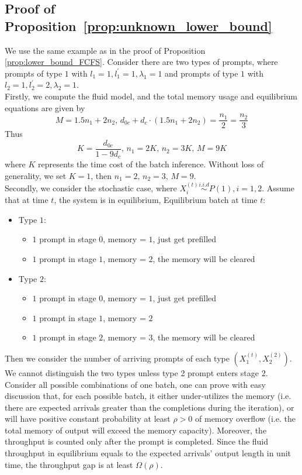 \subsection{Proof of Proposition~\ref{prop:unknown_lower_bound}}\label{sec:proof_unknown_lower_bound}
We use the same example as in the proof of Proposition \ref{prop:lower_bound_FCFS}. Consider there are two types of prompts, where prompts of type $1$ with $l_1=1, l_1^\prime=1, \lambda_1=1$ and prompts of type $1$ with $l_2=1, l_2^\prime=2, \lambda_2=1$. \\
Firstly, we compute the fluid model, and the total memory usage and equilibrium equations are given by
$$M = 1.5n_1+2n_2,\, d_{0c}+d_c\cdot (1.5n_1+2n_2) = \frac{n_1}{2}=\frac{n_2}{3}$$
Thus
$$K = \frac{d_{0c}}{1-9d_c},\, n_1 = 2K,\, n_2=3K,\, M=9K$$
where $K$ represents the time cost of the batch inference. Without loss of generality, we set $K=1$, then $n_1=2, \,n_2=3,\,M=9 $. \\
Secondly, we consider the stochastic case, where $X_i^{(t)}\overset{i.i.d}{\sim} P(1), i=1,2$. Assume that at time $t$, the system is in equilibrium, Equilibrium batch at time $t$:
\begin{itemize}
    \item Type $1$:
    \begin{itemize}
        \itemsep0em
        \item $1$ prompt in stage $0$, memory = $1$, just get prefilled
        \item $1$ prompt in stage $1$, memory = $2$, the memory will be cleared
    \end{itemize}
    \item Type $2$:
    \begin{itemize}
        \itemsep0em
        \item $1$ prompt in stage $0$, memory = $1$, just get prefilled
        \item $1$ prompt in stage $1$, memory = $2$
        \item $1$ prompt in stage $2$, memory = $3$, the memory will be cleared
    \end{itemize}
\end{itemize}
Then we consider the number of arriving prompts of each type $(X_1^{(t)}, X_2^{(2)})$. We cannot distinguish the two types unless type 2 prompt enters stage $2$. Consider all possible combinations of one batch, one can prove with easy discussion that, for each possible batch, it either under-utilizes the memory (i.e. there are expected arrivals greater than the completions during the iteration), or will have positive constant probability at least $\rho>0$ of memory overflow (i.e. the total memory of output will exceed the memory capacity). Moreover, the throughput is counted only after the prompt is completed. Since the fluid throughput in equilibrium equals to the expected arrivals' output length in unit time, the throughput gap is at least $\Omega(\rho).$





